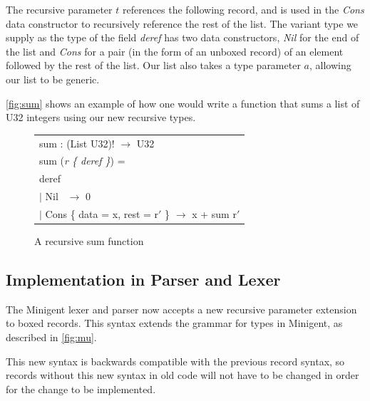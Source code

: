 The recursive parameter $t$ references the following record, and is used in the \textit{Cons} data constructor
to recursively reference the rest of the list.
The variant type 
we supply as the type of the field
\textit{deref} has two data constructors, \textit{Nil} for the end of the list and \textit{Cons} for a pair
(in the form of an unboxed record) of an element followed by the rest of the list.
Our list also takes a type parameter $a$, allowing our list to be generic.

\autoref{fig:sum} shows an example of how one would write a function that sums a list of \textsf{U32} integers
using our new recursive types.

\begin{figure}%
    \begin{center}
        \begin{tabular}{l}
            sum : (List U32)! $\rightarrow$ U32 \\
            sum (\textit{r \{ deref \}}) = \\
            \hspace{0.8em} deref \\
                \hspace{2em} $\vert$ Nil  \quad\quad\quad$\,$   $\rightarrow$ 0 \\
                \hspace{2em} $\vert$ Cons \{ data = x, rest = r$'$ \}  $\rightarrow$ x + sum r$'$
        \end{tabular}
    \end{center}
    \caption[short]{A recursive sum function}
    \label{fig:sum}
\end{figure}

\subsection{Implementation in Parser and Lexer}

The Minigent lexer and parser now accepts a new recursive parameter extension to boxed records. 
This syntax extends the grammar for types in Minigent, as described in \autoref{fig:mu}.

This new syntax is backwards compatible with the previous record syntax, so records without this new
syntax in old code will not have to be changed in order for the change to be implemented.

